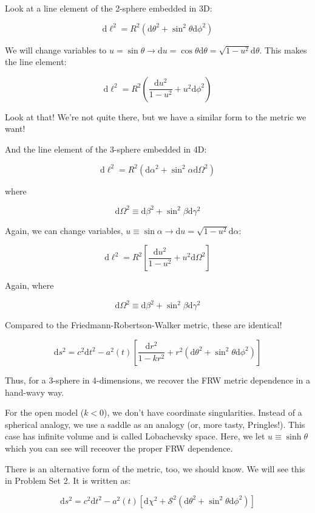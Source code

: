 \documentclass{article}
\newcommand{\be}{\begin{equation}}
\newcommand{\ee}{\end{equation}}
\newcommand{\frw}{\mathrm{d}s^2 = c^2 \mathrm{d}t^2 - a^2\left(t\right) \left[\frac{\mathrm{d}r^2}{1-kr^2} + r^2 \left(\mathrm{d}\theta^2 + \sin^2\theta \mathrm{d}\phi^2\right) \right]}
\begin{document}
Look at a line element of the 2-sphere embedded in 3D:

\be
\mathrm{d}\ell^2 = R^2\left(\mathrm{d}\theta^2 + \sin^2\theta \mathrm{d}\phi^2\right)
\ee

We will change variables to $u = \sin\theta \rightarrow \mathrm{d}u = \cos\theta \mathrm{d}\theta = \sqrt{1-u^2}\mathrm{d}\theta$. This makes the line element:

\be
\mathrm{d}\ell^2 = R^2 \left(\frac{\mathrm{d}u^2}{1-u^2} + u^2 \mathrm{d}\phi^2\right)
\ee

Look at that! We're not quite there, but we have a similar form to the metric we want! 

And the line element of the 3-sphere embedded in 4D:

\be
\mathrm{d}\ell^2 = R^2\left(\mathrm{d}\alpha^2 + \sin^2\alpha \mathrm{d}\Omega^2\right)
\ee

where 

\be
\mathrm{d}\Omega^2 \equiv \mathrm{d}\beta^2 + \sin^2\beta \mathrm{d}\gamma^2
\ee

Again, we can change variables, $u \equiv \sin\alpha \rightarrow \mathrm{d}u = \sqrt{1-u^2}\mathrm{d}\alpha$:

\be
\mathrm{d}\ell^2  =R^2 \left[\frac{\mathrm{d}u^2}{1-u^2} + u^2 \mathrm{d}\Omega^2 \right]
\ee

Again, where

\be
\mathrm{d}\Omega^2 \equiv \mathrm{d}\beta^2 + \sin^2\beta \mathrm{d}\gamma^2
\ee

Compared to the Friedmann-Robertson-Walker metric, these are identical! 

\be
\frw
\ee

Thus, for a $3$-sphere in 4-dimensions, we recover the FRW metric dependence in a hand-wavy way. 

For the open model ($k<0$), we don't have coordinate singularities. Instead of a spherical analogy, we use a saddle as an analogy (or, more tasty, Pringles!). This case has infinite volume and is called Lobachevsky space. Here, we let $u \equiv \sinh\theta$ which you can see will receover the proper FRW dependence. 

There is an alternative form of the metric, too, we should know. We will see this in Problem Set 2. It is written as:

\be
\mathrm{d}s^2 = c^2 \mathrm{d}t^2 - a^2\left(t\right) \left[\mathrm{d}\chi^2 + \mathcal{S}^2 \left(\mathrm{d}\theta^2 + \sin^2\theta \mathrm{d}\phi^2\right)\right]
\ee
\end{document}
